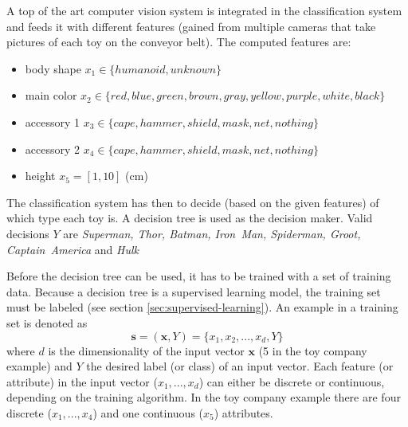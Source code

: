 \documentclass[a4paper]{report}
\begin{document}
    A top of the art computer vision system is integrated in the classification system and feeds it with different features (gained from multiple cameras that take pictures of each toy on the conveyor belt). The computed features are:
    \begin{itemize}
    \item body shape $x_1\in\{humanoid, unknown\}$
    \item main color $x_2\in\{red, blue, green, brown, gray, yellow, purple, white, black\}$
    \item accessory 1 $x_3\in\{cape, hammer, shield, mask, net, nothing\}$
    \item accessory 2 $x_4\in\{cape, hammer, shield, mask, net, nothing\}$
    \item height $x_5=[1, 10]$ (cm)
    \end{itemize}
    The classification system has then to decide (based on the given features) of which type each toy is. A decision tree is used as the decision maker. Valid decisions $Y$ are \textit{Superman, Thor, Batman, Iron~Man, Spiderman, Groot, Captain~America} and \textit{Hulk}
    
    Before the decision tree can be used, it has to be trained with a set of training data. Because a decision tree is a supervised learning model, the training set must be labeled (see section \ref{sec:supervised-learning}). An example in a training set is denoted as \[\textbf{s}=(\textbf{x},Y)=\{x_1, x_2, ..., x_d, Y\}\] where $d$ is the dimensionality of the input vector $\textbf{x}$ (5 in the toy company example) and $Y$ the desired label (or class) of an input vector. Each feature (or attribute) in the input vector ($x_1, ..., x_d$) can either be discrete or continuous, depending on the training algorithm. In the toy company example there are four discrete ($x_1, ..., x_4$) and one continuous ($x_5$) attributes.
    
\end{document}
